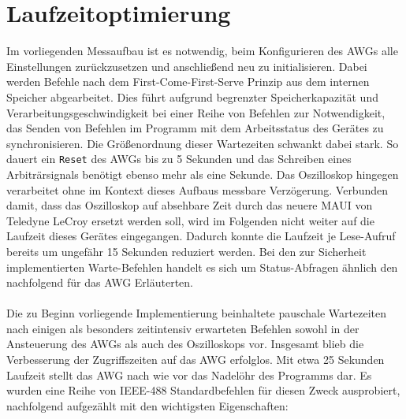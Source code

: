 \documentclass[../Report.tex]{subfiles}
\begin{document}
\section{Laufzeitoptimierung}
Im vorliegenden Messaufbau ist es notwendig, beim Konfigurieren des AWGs alle Einstellungen zurückzusetzen und anschließend neu zu initialisieren. Dabei werden Befehle nach dem First-Come-First-Serve Prinzip aus dem internen Speicher abgearbeitet. Dies führt aufgrund begrenzter Speicherkapazität und Verarbeitungsgeschwindigkeit bei einer Reihe von Befehlen zur Notwendigkeit, das Senden von Befehlen im Programm mit dem Arbeitsstatus des Gerätes zu synchronisieren. 
Die Größenordnung dieser Wartezeiten schwankt dabei stark. So dauert ein \lstinline{Re}\lstinline{set} des AWGs bis zu 5 Sekunden und das Schreiben eines Arbiträrsignals benötigt ebenso mehr als eine Sekunde. Das Oszilloskop hingegen verarbeitet ohne im Kontext dieses Aufbaus messbare Verzögerung. Verbunden damit, dass das Oszilloskop auf absehbare Zeit durch das neuere MAUI von Teledyne LeCroy ersetzt werden soll, wird im Folgenden nicht weiter auf die Laufzeit dieses Gerätes eingegangen. Dadurch konnte die Laufzeit je Lese-Aufruf bereits um ungefähr 15 Sekunden reduziert werden.
Bei den zur Sicherheit implementierten Warte-Befehlen handelt es sich um Status-Abfragen ähnlich den nachfolgend für das AWG Erläuterten.
\\
\\
\noindent
Die zu Beginn vorliegende Implementierung beinhaltete pauschale Wartezeiten nach einigen als besonders zeitintensiv erwarteten Befehlen sowohl in der Ansteuerung des AWGs als auch des Oszilloskops vor. 
Insgesamt blieb die Verbesserung der Zugriffszeiten auf das AWG erfolglos. Mit etwa 25 Sekunden Laufzeit stellt das AWG nach wie vor das Nadelöhr des Programms dar.
Es wurden eine Reihe von IEEE-488 Standardbefehlen für diesen Zweck ausprobiert, nachfolgend aufgezählt mit den wichtigsten Eigenschaften:
\end{document}
